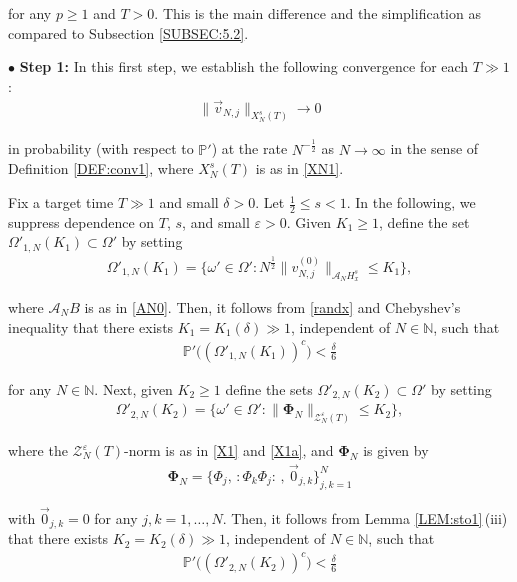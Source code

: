 \documentclass[letterpaper, 11pt,  reqno]{amsart}
\newcommand{\1}{\hspace{0.5mm}\text{I}\hspace{0.2mm}}
\newcommand{\noi}{\noindent}
\newcommand{\N}{\mathbb{N}}
\newcommand{\PP}{\mathbb{P}}
\newcommand{\eps}{\varepsilon}
\newcommand{\dl}{\delta}
\newcommand{\A}{\mathcal{A}}
\newcommand{\ZZ}{\mathcal{Z}}
\newcommand{\wick}[1]{:\!{#1}\!:}
\newcommand{\too}{\longrightarrow}
\renewcommand{\O}{\Omega}
\renewcommand{\o}{\omega}
\numberwithin{equation}{section}
\numberwithin{theorem}{section}
\begin{document}
\noi
for any $p \ge 1$
and $T > 0$.
This  is the main difference and the simplification
as compared to Subsection \ref{SUBSEC:5.2}.



\medskip

\noi
$\bullet$ {\bf Step 1:}
In this first step, we  establish the following convergence
for each $T \gg 1$:
\begin{align}
\| \vec v_{N, j} \|_{X^s_N(T)}
\too 0  
\label{KN1a}
\end{align}

\noi
in probability (with respect to $\PP'$) 
at the rate $N^{-\frac 12 }$ 
as $N \to \infty$
in the sense of Definition \ref{DEF:conv1}, 
where $X^s_N(T)$ is as in \eqref{XN1}.








Fix a target time $T \gg 1$
and small $\dl > 0$.
Let $\frac 12 \le s < 1$.
In the following, we suppress dependence
on $T$,  $s$, and  small $\eps > 0$.
Given  $K_1 \ge 1$, define the set $\O'_{1, N}(K_1)\subset \O'$
by setting
\begin{align}
\O'_{1, N} (K_1)
= \Big\{\o' \in \O':
N^{\frac 12} \|  v^{(0)}_{N, j} \|_{\A_N H_x^s} \le K_1 \Big\}, 
\label{KN2}
\end{align}

\noi
where $\A_N B$ is as in \eqref{AN0}.
Then, it follows from  \eqref{randx} and Chebyshev's  inequality
 that 
there exists $K_1 = K_1(\dl) \gg1 $,
independent of $N \in \N$,  such that 
\begin{align}
\PP'\big( (\O'_{1, N}(K_1))^c \big) < \frac \dl 6
\label{KN3}
\end{align}

\noi
for any $N \in \N$.
Next, given $K_2 \ge1$ define 
the sets $\O'_{2, N}(K_2)\subset \O'$
by setting
\begin{align}
\O'_{2, N} (K_2)
= \Big\{\o' \in \O':
 \|  \pmb \Phi_N \|_{\ZZ^\eps_N (T)} \le K_2\Big\}, 
\label{KN4}
\end{align}

\noi
where 
the 
$\ZZ^\eps_N(T)$-norm  is as in  \eqref{X1}
and \eqref{X1a}, 
and $\pmb \Phi_N$ is given by 
\begin{align*}
\pmb \Phi_N = \big\{
\Phi_j,  \, \wick{\Phi_k \Phi_j} \, , 
 \, %
\vec 0_{j, k}  \big\}_{j, k = 1}^N
\end{align*}



\noi
with $\vec 0_{j, k} = 0$ for any $j, k = 1, \dots, N$.
\noi
Then, it follows from Lemma \ref{LEM:sto1}\,(iii)
that 
there exists $K_2 = K_2(\dl) \gg1 $, independent of $N \in \N$,  such that 
\begin{align}
\PP'\big((\O'_{2, N}(K_2))^c \big) < \frac \dl 6
\label{KN5}
\end{align}
\end{document}
